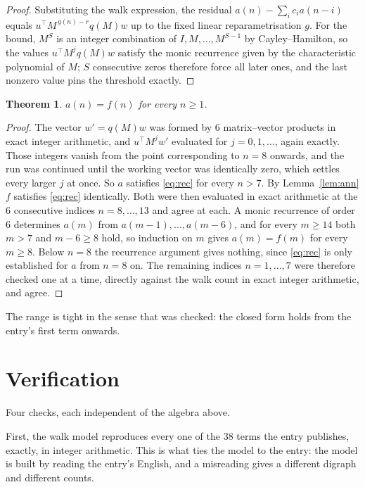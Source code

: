 \documentclass[11pt,a4paper]{article}
\theoremstyle{plain}
\newtheorem{theorem}{Theorem}
\theoremstyle{definition}
\begin{document}
\begin{proof}
Substituting the walk expression, the residual $a(n)-\sum_ic_ia(n-i)$ equals
$u^{\!\top}M^{\,g(n)-r}q(M)w$ up to the fixed linear reparametrisation $g$. For the bound,
$M^{S}$ is an integer combination of $I,M,\dots,M^{S-1}$ by Cayley--Hamilton, so the values
$u^{\!\top}M^{j}q(M)w$ satisfy the monic recurrence given by the characteristic polynomial of
$M$; $S$ consecutive zeros therefore force all later ones, and the last nonzero value pins the
threshold exactly.
\end{proof}

\begin{theorem}
$a(n)=f(n)$ for every $n\ge1$.
\end{theorem}

\begin{proof}
The vector $w'=q(M)w$ was formed by $6$ matrix--vector products in exact integer
arithmetic, and $u^{\!\top}M^{j}w'$ evaluated for $j=0,1,\dots$, again exactly. Those integers
vanish from the point corresponding to $n=8$ onwards, and the run was continued until the
working vector was identically zero, which settles every larger $j$ at once. So $a$ satisfies
\eqref{eq:rec} for every $n>7$. By Lemma~\ref{lem:ann} $f$ satisfies \eqref{eq:rec}
identically. Both were then evaluated in exact arithmetic at the $6$ consecutive indices
$n=8,\dots,13$ and agree at each. A monic recurrence of order $6$
determines $a(m)$ from $a(m-1),\dots,a(m-6)$, and for every $m\ge14$ both
$m>7$ and $m-6\ge8$ hold, so induction on $m$ gives $a(m)=f(m)$ for every
$m\ge8$.
Below $n=8$ the recurrence argument gives nothing, since \eqref{eq:rec} is only
established for $a$ from $n=8$ on. The remaining indices $n=1,\dots,7$ were
therefore checked one at a time, directly against the walk count in exact integer arithmetic,
and agree.
\end{proof}

The range is tight in the sense that was checked: the closed form holds from the entry's first term onwards.

\section{Verification}

Four checks, each independent of the algebra above.

First, the walk model reproduces every one of the $38$ terms the entry publishes,
exactly, in integer arithmetic. This is what ties the model to the entry: the model is built
by reading the entry's English, and a misreading gives a different digraph and different
counts.
\end{document}
